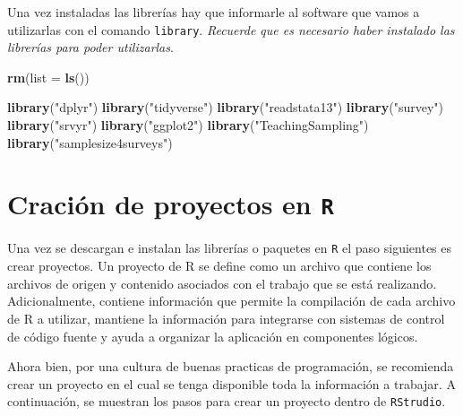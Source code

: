\documentclass[
  spanish,
  12pt,
]{book}
\newenvironment{Shaded}{\begin{snugshade}}{\end{snugshade}}
\newcommand{\AttributeTok}[1]{\textcolor[rgb]{0.13,0.29,0.53}{#1}}
\newcommand{\FunctionTok}[1]{\textcolor[rgb]{0.13,0.29,0.53}{\textbf{#1}}}
\newcommand{\NormalTok}[1]{#1}
\newcommand{\StringTok}[1]{\textcolor[rgb]{0.31,0.60,0.02}{#1}}
\begin{document}
Una vez instaladas las librerías hay que informarle al software que vamos a utilizarlas con el comando \texttt{library}. \emph{Recuerde que es necesario haber instalado las librerías para poder utilizarlas}.

\begin{Shaded}
\begin{Highlighting}[]
\FunctionTok{rm}\NormalTok{(}\AttributeTok{list =} \FunctionTok{ls}\NormalTok{())}

\FunctionTok{library}\NormalTok{(}\StringTok{"dplyr"}\NormalTok{)}
\FunctionTok{library}\NormalTok{(}\StringTok{"tidyverse"}\NormalTok{)}
\FunctionTok{library}\NormalTok{(}\StringTok{"readstata13"}\NormalTok{) }
\FunctionTok{library}\NormalTok{(}\StringTok{"survey"}\NormalTok{)}
\FunctionTok{library}\NormalTok{(}\StringTok{"srvyr"}\NormalTok{)}
\FunctionTok{library}\NormalTok{(}\StringTok{"ggplot2"}\NormalTok{)}
\FunctionTok{library}\NormalTok{(}\StringTok{"TeachingSampling"}\NormalTok{)}
\FunctionTok{library}\NormalTok{(}\StringTok{"samplesize4surveys"}\NormalTok{)}
\end{Highlighting}
\end{Shaded}

\section{\texorpdfstring{Cración de proyectos en \texttt{R}}{Cración de proyectos en R}}\label{craciuxf3n-de-proyectos-en-r}

Una vez se descargan e instalan las librerías o paquetes en \texttt{R} el paso siguientes es crear proyectos. Un proyecto de R se define como un archivo que contiene los archivos de origen y contenido asociados con el trabajo que se está realizando. Adicionalmente, contiene información que permite la compilación de cada archivo de R a utilizar, mantiene la información para integrarse con sistemas de control de código fuente y ayuda a organizar la aplicación en componentes lógicos.

Ahora bien, por una cultura de buenas practicas de programación, se recomienda crear un proyecto en el cual se tenga disponible toda la información a trabajar. A continuación, se muestran los pasos para crear un proyecto dentro de \texttt{RStrudio}.
\end{document}
